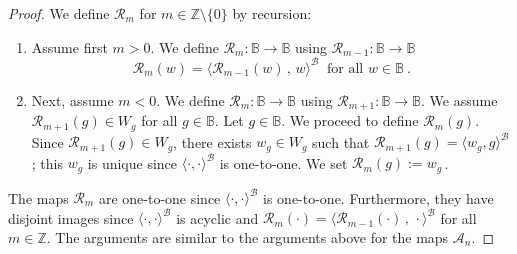 \documentclass[10pt,a4paper, openany,  oldfontcommands]{memoir}
\newtheorem{open problem} [theorem] {Open Problem}
\newtheorem{open question} [theorem] {Open Question}
\begin{document}
\begin{proof}
We define  $  \mathcal{R}_m $  for  $  m  \in  \mathbb{Z} \setminus  \lbrace 0  \rbrace  $  by recursion: 
\begin{enumerate}
\item  Assume first  $  m > 0  $.   We define   $  \mathcal{R}_m :    \mathbb{B} \to  \mathbb{B}   $  using 
$  \mathcal{R}_{m-1} :    \mathbb{B} \to  \mathbb{B}   $
\[
  \mathcal{R}_m   \left(  w  \right)     =    \langle      \mathcal{R}_{m-1}   \left(  w  \right)     \,  ,   \,   w    \rangle^{  \mathcal{B}  }  
  \     \mbox{  for all }    w  \in  \mathbb{B}
  \         .
\]






\item  Next, assume  $  m  <  0  $.   We define   $  \mathcal{R}_m :    \mathbb{B} \to  \mathbb{B}   $  using 
$  \mathcal{R}_{m+1} :    \mathbb{B} \to  \mathbb{B}   $. 
We  assume     $  \mathcal{R}_{ m+1}   \left(    g  \right)      \in  W_g  $  for all $  g  \in    \mathbb{B}   $. 
Let  $  g   \in  \mathbb{B} $. 
We proceed to define    $   \mathcal{R}_{ m}   \left(    g  \right)    $. 
Since      $  \mathcal{R}_{ m+1}   \left(    g  \right)      \in  W_g  $,  there exists  $  w_g  \in  W_g  $  such that  
$  \mathcal{R}_{ m+1}   \left(    g  \right)     =  \langle  w_g  ,  g  \rangle^{  \mathcal{B}  }  $; 
this  $  w_g  $  is unique   since    $  \langle  \cdot  ,  \cdot   \rangle^{  \mathcal{B}  }  $  is one-to-one. 
We set   $      \mathcal{R}_{ m}   \left(    g  \right)    :=  w_g     \,    $. 
\end{enumerate}
The  maps  $  \mathcal{R}_m $   are one-to-one since  $  \langle  \cdot  ,  \cdot   \rangle^{  \mathcal{B}  }  $  is one-to-one. 
Furthermore,  they have disjoint images  since     $  \langle  \cdot  ,  \cdot   \rangle^{  \mathcal{B}  }  $  is acyclic
and     $  \mathcal{R}_m   \left( \cdot  \right)     =  \langle    \mathcal{R}_{ m-1}   \left( \cdot  \right)      \,  ,  \,  \cdot   \rangle^{  \mathcal{B}  }  $  for all  $  m  \in  \mathbb{Z} $. 
The arguments are similar to the arguments above for the maps  $  \mathcal{A}_n $. 





\end{proof}
\end{document}
